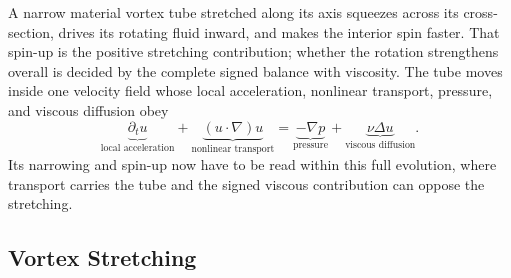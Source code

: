 
A narrow material vortex tube stretched along its axis squeezes across its cross-section, drives its rotating fluid inward, and makes the interior spin faster.
That spin-up is the positive stretching contribution; whether the rotation strengthens overall is decided by the complete signed balance with viscosity.
The tube moves inside one velocity field whose local acceleration, nonlinear transport, pressure, and viscous diffusion obey
\[
  \underbrace{\partial_t u}_{\text{local acceleration}}
  +
  \underbrace{(u\cdot\nabla)u}_{\text{nonlinear transport}}
  =
  \underbrace{-\nabla p}_{\text{pressure}}
  +
  \underbrace{\nu\Delta u}_{\text{viscous diffusion}}.
\]
Its narrowing and spin-up now have to be read within this full evolution, where transport carries the tube and the signed viscous contribution can oppose the stretching.

\subsection{Vortex Stretching}\label{sub:ThePerfectlyStretchingVortex}

